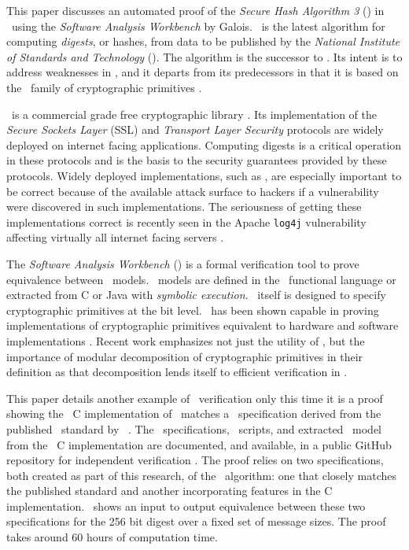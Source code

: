 This paper discusses an automated proof of the \emph{Secure Hash Algorithm 3} (\shaThree) in \openssl\ using the \emph{Software Analysis Workbench} by Galois.
\shaThree\ is the latest algorithm for computing \emph{digests}, or hashes, from data to be published by the \emph{National Institute of Standards and Technology} (\nist).
The algorithm is the successor to \shaTwo.
Its intent is to address weaknesses in \shaTwo, and it departs from its predecessors in that it is based on the \keccak\ family of cryptographic primitives \cite{fips202}.

\openssl\ is a commercial grade free cryptographic library \cite{openssl}.
Its implementation of the \emph{Secure Sockets Layer} (SSL) and \emph{Transport Layer Security} protocols are widely deployed on internet facing applications.
Computing digests is a critical operation in these protocols and is the basis to the security guarantees provided by these protocols.
Widely deployed implementations, such as \openssl, are especially important to be correct because of the available attack surface to hackers if a vulnerability were discovered in such implementations.
The seriousness of getting these implementations correct is recently seen in the Apache \texttt{log4j} vulnerability affecting virtually all internet facing servers \cite{log4j}.

The \emph{Software Analysis Workbench} (\saw) is a formal verification tool to prove equivalence between \sawcore\ models. \sawcore\ models are defined in the \cryptol\ functional language or extracted from C or Java with \emph{symbolic execution}.
\cryptol\ itself is designed to specify cryptographic primitives at the bit level.
\saw\ has been shown capable in proving implementations of cryptographic primitives equivalent to hardware and software implementations \cite{crypt-hi,hard-soft,design-verif}.
Recent work emphasizes not just the utility of \saw, but the importance of modular decomposition of cryptographic primitives in their definition as that decomposition lends itself to efficient verification in \saw \cite{nfm-us}. 

This paper details another example of \saw\ verification only this time it is a proof showing the \openssl\ C implementation of \shaThree\ matches a \cryptol\ specification derived from the published \fips\ standard by \nist\ \cite{fips202}.
The \cryptol\ specifications, \saw\ scripts, and extracted \sawcore\ model from the \openssl\ C implementation are documented, and available, in a public GitHub repository for independent verification \cite{sha3proof}.
The proof relies on two specifications, both created as part of this research, of the \shaThree\ algorithm: one that closely matches the published standard and another incorporating features in the C implementation.
\saw\ shows an input to output equivalence between these two specifications for the 256 bit digest over a fixed set of message sizes. The proof takes around 60 hours of computation time.

